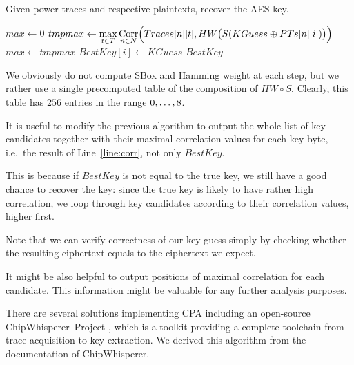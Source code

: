 	\begin{alg}
	\label{alg:cpa}
	Given power traces and respective plaintexts, recover the AES key.
		\begin{algorithmic}[1]
					\State $max \gets 0$
						\State $tmpmax \gets \max\limits_{t\in T} \operatorname*{Corr}\limits_{n\in N}\Bigl(Traces[n][t], HW\bigl(S(KGuess\oplus PTs[n][i])\bigr)\Bigr)$
							\label{line:corr}
							\State $max \gets tmpmax$
							\State $BestKey[i] \gets KGuess$
						\EndIf
					\EndFor
				\EndFor
				\State\Return $BestKey$
			\EndFunction
		\end{algorithmic}
	\end{alg}
	
	\begin{remark}
	\label{rem:attacklookup}
		We obviously do not compute SBox and Hamming weight at each step, but we rather use a single precomputed table of the composition of $HW\circ S$. Clearly, this table has $256$ entries in the range $0 , \ldots , 8$.
	\end{remark}
	
	\begin{note}
	\label{note:fulllist}
		It is useful to modify the previous algorithm to output the whole list of key candidates together with their maximal correlation values for each key byte, i.e.\ the result of Line~\ref{line:corr}, not only $BestKey$.
		
		This is because if $BestKey$ is not equal to the true key, we still have a good chance to recover the key: since the true key is likely to have rather high correlation, we loop through key candidates according to their correlation values, higher first.
		
		Note that we can verify correctness of our key guess simply by checking whether the resulting ciphertext equals to the ciphertext we expect.
	\end{note}
	
	\begin{note}
	\label{note:leakpos}
		It might be also helpful to output positions of maximal correlation for each candidate. This information might be valuable for any further analysis purposes.
	\end{note}
	
	There are several solutions implementing CPA including an open-source ChipWhisperer\texttrademark\ Project \cite{chipwhisperer}, which is a toolkit providing a complete toolchain from trace acquisition to key extraction. We derived this algorithm from the documentation of ChipWhisperer\texttrademark.


